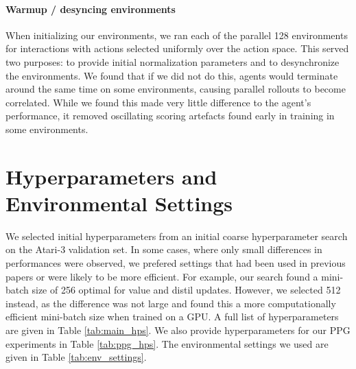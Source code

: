 \documentclass{article}
\begin{document}
\paragraph{Warmup / desyncing environments} When initializing our environments, we ran each of the parallel 128 environments for  interactions with actions selected uniformly over the action space. This served two purposes: to provide initial normalization parameters and to desynchronize the environments. We found that if we did not do this, agents would terminate around the same time on some environments, causing parallel rollouts to become correlated. While we found this made very little difference to the agent's performance, it removed oscillating scoring artefacts found early in training in some environments.


\section{Hyperparameters and Environmental Settings}
\label{app:hyperparameters}

We selected initial hyperparameters from an initial coarse hyperparameter search on the Atari-3 validation set. In some cases, where only small differences in performances were observed, we prefered settings that had been used in previous papers or were likely to be more efficient. For example, our search found a mini-batch size of 256 optimal for value and distil updates. However, we selected 512 instead, as the difference was not large and found this a more computationally efficient mini-batch size when trained on a GPU. A full list of hyperparameters are given in Table \ref{tab:main_hps}. We also provide hyperparameters for our PPG experiments in Table \ref{tab:ppg_hps}. The environmental settings we used are given in Table \ref{tab:env_settings}. 
\end{document}
